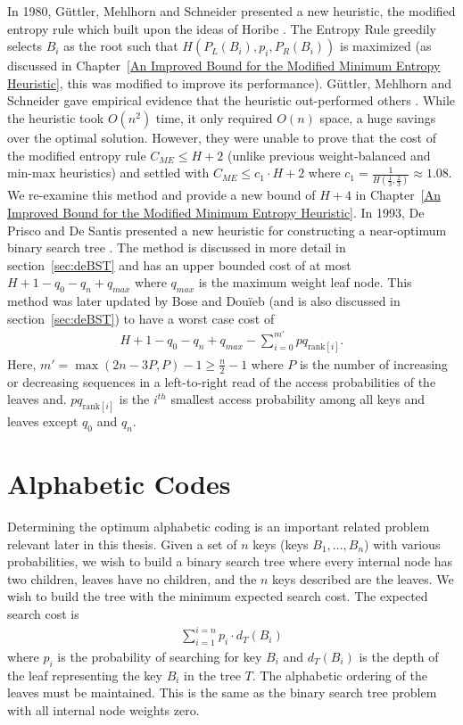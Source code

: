 \documentclass[letterpaper,12pt,titlepage,oneside,final]{book}
\theoremstyle{plain}
\begin{document}
  In 1980, G{\"u}ttler, Mehlhorn and Schneider presented a new heuristic, the modified entropy rule \cite{guttler1980binary} which built upon the ideas of Horibe \cite{horibe1977improved}. The Entropy Rule greedily selects $B_i$ as the root such that $H(P_L(B_i), p_i, P_R(B_i))$ is maximized (as discussed in Chapter~\ref{An Improved Bound for the Modified Minimum Entropy Heuristic}, this was modified to improve its performance). G{\"u}ttler, Mehlhorn and Schneider gave empirical evidence that the heuristic out-performed others \cite{guttler1980binary}. While the heuristic took $O(n^2)$ time, it only required $O(n)$ space, a huge savings over the optimal solution. However, they were unable to prove that the cost of the modified entropy rule $C_{ME} \leq H+2$ (unlike previous weight-balanced and min-max heuristics) and settled with $C_{ME} \leq c_1\cdot H+2$ where $c_1=\frac{1}{H(\frac{1}{3}, \frac{2}{3})} \approx 1.08$. We re-examine this method and provide a new bound of $H+4$ in Chapter~\ref{An Improved Bound for the Modified Minimum Entropy Heuristic}. In 1993, De Prisco and De Santis presented a new heuristic for constructing a near-optimum binary search tree \cite{de1993binary}. The method is discussed in more detail in section~\ref{sec:deBST} and has an upper bounded cost of at most $H+1-q_0-q_n+q_{max}$ where $q_{max}$ is the maximum weight leaf node. This method was later updated by Bose and Dou\"{i}eb (and is also discussed in section~\ref{sec:deBST}) to have a worst case cost of 
\begin{align*}
H + 1 - q_0 - q_n + q_{max} - \sum_{i=0}^{m'} pq_{\text{rank}[i]}.
\end{align*}
Here, $m'=\max({2n-3P,P})-1 \geq \frac{n}{2} - 1$ where $P$ is the number of increasing or decreasing sequences in a left-to-right read of the access probabilities of the leaves and.  $pq_{\text{rank}[i]}$ is the $i^{th}$ smallest access probability among all keys and leaves except $q_0$ and $q_n$.

 
\section{Alphabetic Codes}

Determining the optimum alphabetic coding is an important related problem relevant later in this thesis. Given a set of $n$ keys (keys $B_1, ..., B_n$) with various probabilities, we wish to build a binary search tree where every internal node has two children, leaves have no children, and the $n$ keys described are the leaves. We wish to build the tree with the minimum expected search cost. The expected search cost is
\begin{align*}
\sum_{i=1}^{i=n} p_i \cdot d_T(B_i)
\end{align*}
where $p_i$ is the probability of searching for key $B_i$ and $d_T(B_i)$ is the depth of the leaf representing the key $B_i$ in the tree $T$. The alphabetic ordering of the leaves must be maintained. This is the same as the binary search tree problem with all internal node weights zero.
\end{document}
